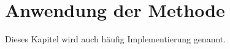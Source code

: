 \cleardoublepage
\chapter{Anwendung der Methode}
\label{ch:AnwendMeth}

Dieses Kapitel wird auch häufig Implementierung genannt. 

